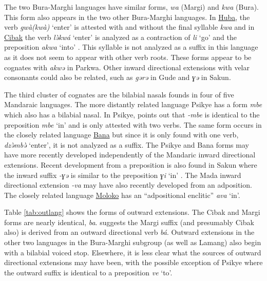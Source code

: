 \hspace*{-1pt}The two Bura-Marghi languages have similar forms, \textit{wa} (Margi) and \textit{kwa} (Bura). This form also appears in the two other Bura-Marghi languages. In \hyperref[huba]{Huba}, the verb \textit{gwà(kwà)} `enter' is attested with and without the final syllable \textit{kwa} and in \hyperref[ciba]{Cibak} the verb \textit{lə̀kwá} `enter' is analyzed as a contraction of \textit{li} `go' and the preposition \textit{akwa} `into' \citep[136]{hoffmannZurSpracheCibak1955}. This syllable is not analyzed as a suffix in this language as it does not seem to appear with other verb roots. These forms appear to be cognates with \textit{akwə} in Parkwa. Other inward directional extensions with velar consonants could also be related, such as \textit{gərə} in Gude and \textit{ɣə} in Sakun.

The third cluster of cognates are the bilabial nasals founds in four of five Mandaraic languages. The more distantly related language Psikye has a form \textit{mbe} which also has a bilabial nasal. In Psikye, \citep[118]{smithKapsikiLanguage1969} points out that \textit{-mbe} is identical to the preposition \textit{mbe} `in' and is only attested with two verbs. The same form occurs in the closely related language \hyperref[bana]{Bana} but since it is only found with one verb, \textit{dzə̀mbə̀} `enter', it is not analyzed as a suffix. The Psikye and Bana forms may have more recently developed independently of the Mandaric inward directional extensions. Recent development from a preposition is also found in Sakun where the  inward suffix \textit{-ɣə} is similar to the preposition \textit{ɣi} ‘in’ \citep[273]{thomasGrammarSakunSukur2014}. The Mada inward directional extension \textit{-va} may have also recently developed from an adposition. The closely related language \hyperref[molo]{Moloko} has an ``adpositional enclitic'' \textit{ava} `in'.

Table \ref{tab:outlang} shows the forms of outward extensions. The Cibak and Margi forms are nearly identical, \textit{ba}.  \citet[125]{hoffmannGrammarMargiLanguage1963} suggests the Margi suffix (and presumably Cibak also) is derived from an outward directional verb \textit{bá}. Outward extensions in the other two languages in the Bura-Marghi subgroup (as well as Lamang) also begin with a bilabial voiced stop. Elsewhere, it is less clear what the sources of outward directional extensions may have been, with the possible exception of Psikye where the outward suffix is identical to a preposition \textit{ve} `to'. 

